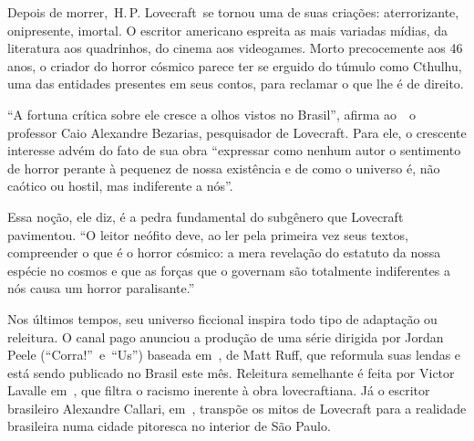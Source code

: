 \begin{changemargin}
\hspace{.5cm}
\vspace*{1cm}
\enlargethispage{-\baselineskip}


\medskip

\hfill{}

\bigskip
\bigskip
\bigskip

Depois de morrer, H.\,P. Lovecraft se tornou uma de suas criações: aterrorizante, onipresente, imortal. O escritor americano espreita as mais variadas mídias, da literatura aos quadrinhos, do cinema aos videogames. Morto precocemente aos 46 anos, o criador do horror cósmico parece ter se erguido do túmulo como Cthulhu, uma das entidades presentes em seus contos, para reclamar o que lhe é de direito.

“A fortuna crítica sobre ele cresce a olhos vistos no Brasil”, afirma ao {} o professor Caio Alexandre Bezarias, pesquisador de Lovecraft. Para ele, o crescente interesse advém do fato de sua obra “expressar como nenhum autor o sentimento de horror perante à pequenez de nossa existência e de como o universo é, não caótico ou hostil, mas indiferente a nós”. 

Essa noção, ele diz, é a pedra fundamental do subgênero que Lovecraft pavimentou. “O leitor neófito deve, ao ler pela primeira vez seus textos, compreender o que é o horror cósmico: a mera revelação do estatuto da nossa espécie no cosmos e que as forças que o governam são totalmente indiferentes a nós causa um horror paralisante.”

Nos últimos tempos, seu universo ficcional inspira todo tipo de adaptação ou releitura. O canal pago  anunciou a produção de uma série dirigida por Jordan Peele (“Corra!” e “Us”) baseada em {}, de Matt Ruff, que reformula suas lendas e está sendo publicado no Brasil este mês. Releitura semelhante é feita por Victor Lavalle em {}, que filtra o racismo inerente à obra lovecraftiana. Já o escritor brasileiro Alexandre Callari, em {}, transpõe os mitos de Lovecraft para a realidade brasileira numa cidade pitoresca no interior de São Paulo. 


\end{changemargin}
